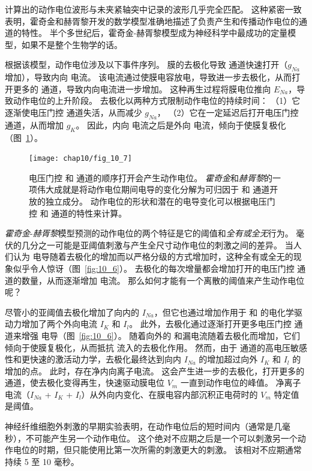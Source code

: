 计算出的动作电位波形与未夹紧轴突中记录的波形几乎完全匹配。
这种紧密一致表明，霍奇金和赫胥黎开发的数学模型准确地描述了负责产生和传播动作电位的通道的特性。
半个多世纪后，霍奇金-赫胥黎模型成为神经科学中最成功的定量模型，如果不是整个生物学的话。


根据该模型，动作电位涉及以下事件序列。
膜的去极化导致  通道快速打开（$g_{Na}$ 增加），导致内向  电流。
该电流通过使膜电容放电，导致进一步去极化，从而打开更多的  通道，导致内向电流进一步增加。 
这种再生过程将膜电位推向 $E_{Na}$，导致动作电位的上升阶段。
去极化以两种方式限制动作电位的持续时间：
（1）它逐渐使电压门控  通道失活，从而减少 $g_{Na}$，
（2）它在一定延迟后打开电压门控  通道，从而增加 $g_K$。
因此，内向  电流之后是外向  电流，倾向于使膜复极化（图~\ref{fig:10_7}）。


\begin{figure}[htbp]
	\centering
	\texttt{[image: chap10/fig\_10\_7]}
	\caption{电压门控  和  通道的顺序打开会产生动作电位。
		\textit{霍奇金}和\textit{赫胥黎}的一项伟大成就是将动作电位期间电导的变化分解为可归因于  和  通道开放的独立成分。
		动作电位的形状和潜在的电导变化可以根据电压门控  和  通道的特性来计算\cite{hille1978ionic}。}
	\label{fig:10_7}
\end{figure}


\textit{霍奇金}-\textit{赫胥黎}模型预测的动作电位的两个特征是它的阈值和\textit{全有或全无}行为。
毫伏的几分之一可能是亚阈值刺激与产生全尺寸动作电位的刺激之间的差异。
当人们认为  电导随着去极化的增加而以严格分级的方式增加时，这种全有或全无的现象似乎令人惊讶（图~\ref{fig:10_6}）。 
去极化的每次增量都会增加打开的电压门控  通道的数量，从而逐渐增加  电流。
那么如何才能有一个离散的阈值来产生动作电位呢？


尽管小的亚阈值去极化增加了向内的 $I_{Na}$，但它也通过增加作用于  和  的电化学驱动力增加了两个外向电流 $I_K$ 和 $I_l$。
此外，去极化通过逐渐打开更多电压门控  通道来增强  电导（图~\ref{fig:10_6}）。
随着向外的  和漏电流随着去极化而增加，它们倾向于使膜复极化，从而抵抗  流入的去极化作用。
然而，由于  通道的高电压敏感性和更快速的激活动力学，去极化最终达到向内 $I_{Na}$ 的增加超过向外 $I_K$ 和 $I_l$ 的增加的点。
此时，存在净内向离子电流。
这会产生进一步的去极化，打开更多的  通道，使去极化变得再生，快速驱动膜电位 $V_m$ 一直到动作电位的峰值。
净离子电流（$I_{Na}$ + $I_K$ + $I_l$）从外向内变化、在膜电容内部沉积正电荷时的 $V_m$ 特定值是阈值。


神经纤维细胞外刺激的早期实验表明，在动作电位后的短时间内（通常是几毫秒），不可能产生另一个动作电位。 
这个绝对不应期之后是一个可以刺激另一个动作电位的时期，但只能使用比第一次所需的刺激更大的刺激。 
该相对不应期通常持续 5 至 10 毫秒。


